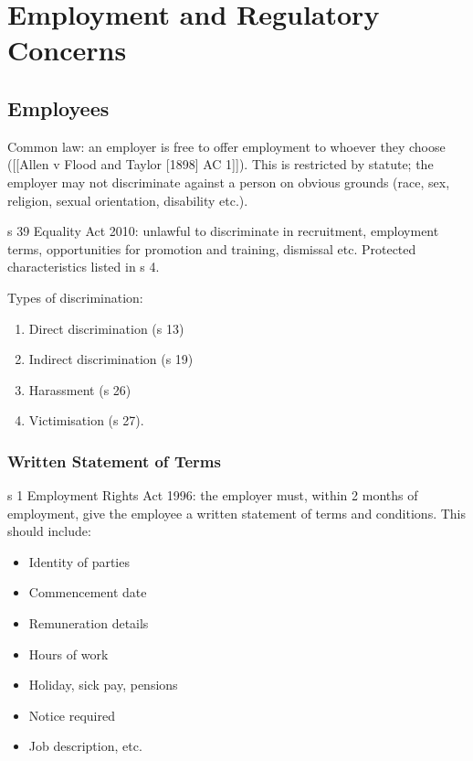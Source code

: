 \documentclass[
]{article}
\author{}
\date{}
\providecommand{\tightlist}{%
  \setlength{\itemsep}{0pt}\setlength{\parskip}{0pt}}
\begin{document}
{
\setcounter{tocdepth}{3}
\tableofcontents
}
\hypertarget{employment-and-regulatory-concerns}{%
\section{Employment and Regulatory
Concerns}\label{employment-and-regulatory-concerns}}

\hypertarget{employees}{%
\subsection{Employees}\label{employees}}

Common law: an employer is free to offer employment to whoever they
choose ({[}{[}Allen v Flood and Taylor {[}1898{]} AC 1{]}{]}). This is
restricted by statute; the employer may not discriminate against a
person on obvious grounds (race, sex, religion, sexual orientation,
disability etc.).

s 39 Equality Act 2010: unlawful to discriminate in recruitment,
employment terms, opportunities for promotion and training, dismissal
etc. Protected characteristics listed in s 4.

Types of discrimination:

\begin{enumerate}
\def\labelenumi{\arabic{enumi}.}
\tightlist
\item
  Direct discrimination (s 13)
\item
  Indirect discrimination (s 19)
\item
  Harassment (s 26)
\item
  Victimisation (s 27).
\end{enumerate}

\hypertarget{written-statement-of-terms}{%
\subsubsection{Written Statement of
Terms}\label{written-statement-of-terms}}

s 1 Employment Rights Act 1996: the employer must, within 2 months of
employment, give the employee a written statement of terms and
conditions. This should include:

\begin{itemize}
\tightlist
\item
  Identity of parties
\item
  Commencement date
\item
  Remuneration details
\item
  Hours of work
\item
  Holiday, sick pay, pensions
\item
  Notice required
\item
  Job description, etc.
\end{itemize}
\end{document}
